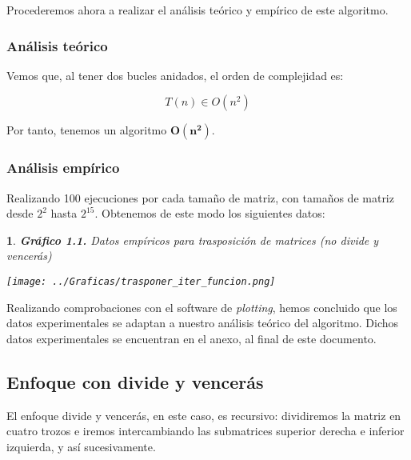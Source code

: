 \documentclass[10pt, a4paper]{article}
\theoremstyle{theorem-style}
\newtheorem*{datos}{}
\theoremstyle{theorem-style}
\theoremstyle{definition-style}
\theoremstyle{remark-style}
\theoremstyle{example-style}
\theoremstyle{definition-style}
\theoremstyle{remark-style}
\begin{document}
Procederemos ahora a realizar el análisis teórico y empírico de este algoritmo.

\subsubsection{Análisis teórico}

Vemos que, al tener dos bucles anidados, el orden de complejidad es:

$$T(n) \in O(n^2)$$

Por tanto, tenemos un algoritmo $\boldsymbol{O(n^2)}$.

\subsubsection{Análisis empírico}

Realizando 100 ejecuciones por cada tamaño de matriz, con tamaños de matriz desde $2^2$ hasta $2^{15}$. Obtenemos de este modo los siguientes datos:

\begin{datos}
	{\bf\sffamily Gráfico 1.1.} {\sffamily Datos empíricos para trasposición de matrices (no divide y vencerás)}\\
	\vspace{-0.7cm}
	\begin{center}
		\texttt{[image: ../Graficas/trasponer\_iter\_funcion.png]}
	\end{center}	
\end{datos}

Realizando comprobaciones con el software de \emph{plotting}, hemos concluido que los datos experimentales se adaptan a nuestro análisis teórico del algoritmo. Dichos datos experimentales se encuentran en el anexo, al final de este documento.

\pagebreak

\subsection{Enfoque con divide y vencerás}

El enfoque divide y vencerás, en este caso, es recursivo: dividiremos la matriz en cuatro trozos e iremos intercambiando las submatrices superior derecha e inferior izquierda, y así sucesivamente.\\
\end{document}

